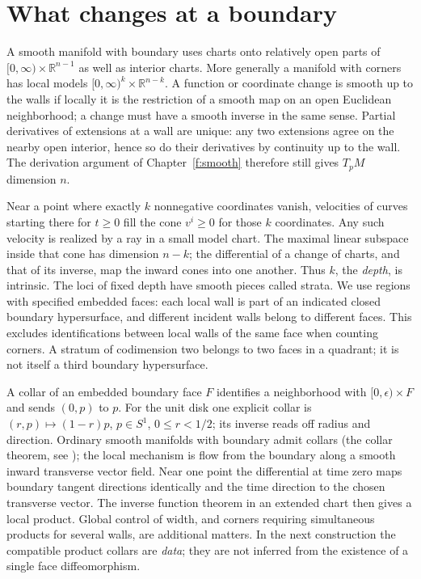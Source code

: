 \section{What changes at a boundary}
A smooth manifold with boundary uses charts onto relatively open parts of $[0,\infty)\times\mathbb R^{n-1}$ as well as interior charts. More generally a manifold with corners has local models $[0,\infty)^k\times\mathbb R^{n-k}$. A function or coordinate change is smooth up to the walls if locally it is the restriction of a smooth map on an open Euclidean neighborhood; a change must have a smooth inverse in the same sense. Partial derivatives of extensions at a wall are unique: any two extensions agree on the nearby open interior, hence so do their derivatives by continuity up to the wall. The derivation argument of Chapter~\ref{f:smooth} therefore still gives $T_pM$ dimension $n$.

Near a point where exactly $k$ nonnegative coordinates vanish, velocities of curves starting there for $t\geq0$ fill the cone $v^i\geq0$ for those $k$ coordinates. Any such velocity is realized by a ray in a small model chart. The maximal linear subspace inside that cone has dimension $n-k$; the differential of a change of charts, and that of its inverse, map the inward cones into one another. Thus $k$, the \emph{depth}, is intrinsic. The loci of fixed depth have smooth pieces called strata. We use regions with specified embedded faces: each local wall is part of an indicated closed boundary hypersurface, and different incident walls belong to different faces. This excludes identifications between local walls of the same face when counting corners. A stratum of codimension two belongs to two faces in a quadrant; it is not itself a third boundary hypersurface.

A collar of an embedded boundary face $F$ identifies a neighborhood with $[0,\epsilon)\times F$ and sends $(0,p)$ to $p$. For the unit disk one explicit collar is $(r,p)\mapsto (1-r)p$, $p\in S^1$, $0\le r<1/2$; its inverse reads off radius and direction. Ordinary smooth manifolds with boundary admit collars (the collar theorem, see \cite{LeeSM}); the local mechanism is flow from the boundary along a smooth inward transverse vector field. Near one point the differential at time zero maps boundary tangent directions identically and the time direction to the chosen transverse vector. The inverse function theorem in an extended chart then gives a local product. Global control of width, and corners requiring simultaneous products for several walls, are additional matters. In the next construction the compatible product collars are \emph{data}; they are not inferred from the existence of a single face diffeomorphism.

